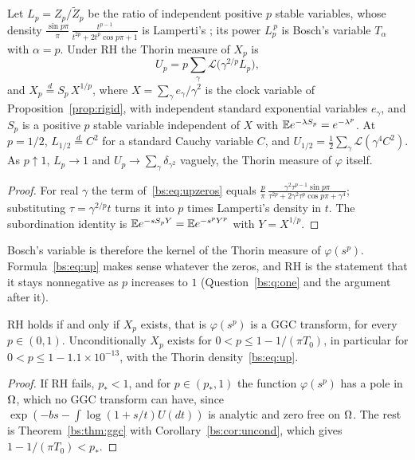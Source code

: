 \begin{corollary}\label{bs:cor:lamperti}
Let $L_p=Z_p/\tilde Z_p$ be the ratio of independent positive $p$ stable variables, whose density $\frac{\sin p\pi}{\pi}\,\frac{t^{p-1}}{t^{2p}+2t^p\cos p\pi+1}$ is Lamperti's \cite{boLamperti}; its power $L_p^{\,p}$ is Bosch's variable $T_\alpha$ with $\alpha=p$. Under RH the Thorin measure of $X_p$ is
\[
U_p=p\sum_\gamma\mathcal L\bigl(\gamma^{2/p}L_p\bigr),
\]
and $X_p\stackrel{d}{=}S_p\,X^{1/p}$, where $X=\sum_\gamma e_\gamma/\gamma^2$ is the clock variable of Proposition~\ref{prop:rigid}, with independent standard exponential variables $e_\gamma$, and $S_p$ is a positive $p$ stable variable independent of $X$ with $\mathbb{E} e^{-\lambda S_p}=e^{-\lambda^p}$. At $p=1/2$, $L_{1/2}\stackrel{d}{=}C^2$ for a standard Cauchy variable $C$, and $U_{1/2}=\frac12\sum_\gamma\mathcal L(\gamma^4C^2)$. As $p\uparrow1$, $L_p\to1$ and $U_p\to\sum_\gamma\delta_{\gamma^2}$ vaguely, the Thorin measure of $\varphi$ itself.
\end{corollary}

\begin{proof}
For real $\gamma$ the term of~\eqref{bs:eq:upzeros} equals $\frac{p}{\pi}\,\frac{\gamma^2\tau^{p-1}\sin p\pi}{\tau^{2p}+2\gamma^2\tau^p\cos p\pi+\gamma^4}$; substituting $\tau=\gamma^{2/p}t$ turns it into $p$ times Lamperti's density in $t$. The subordination identity is $\mathbb{E} e^{-sS_pY}=\mathbb{E} e^{-s^pY^p}$ with $Y=X^{1/p}$.
\end{proof}

Bosch's variable is therefore the kernel of the Thorin measure of $\varphi(s^p)$. Formula~\eqref{bs:eq:up} makes sense whatever the zeros, and RH is the statement that it stays nonnegative as $p$ increases to $1$ (Question~\ref{bs:q:one} and the argument after it).

\begin{corollary}\label{bs:cor:rhX}
RH holds if and only if $X_p$ exists, that is $\varphi(s^p)$ is a GGC transform, for every $p\in(0,1)$. Unconditionally $X_p$ exists for $0<p\le1-1/(\pi T_0)$, in particular for $0<p\le1-1.1\times10^{-13}$, with the Thorin density~\eqref{bs:eq:up}.
\end{corollary}

\begin{proof}
If RH fails, $p_*<1$, and for $p\in(p_*,1)$ the function $\varphi(s^p)$ has a pole in $\Omega$, which no GGC transform can have, since $\exp(-bs-\int\log(1+s/t)U(dt))$ is analytic and zero free on $\Omega$. The rest is Theorem~\ref{bs:thm:ggc} with Corollary~\ref{bs:cor:uncond}, which gives $1-1/(\pi T_0)<p_*$.
\end{proof}

